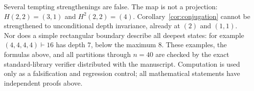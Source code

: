 \documentclass[10pt]{amsart}
\theoremstyle{definition}
\begin{document}
Several tempting strengthenings are false.  The map is not a projection:
$H(2,2)=(3,1)$ and $H^2(2,2)=(4)$.  Corollary~\ref{cor:conjugation} cannot
be strengthened to unconditional depth invariance, already at
$(2)$ and $(1,1)$.  Nor does a simple rectangular boundary describe all
deepest states: for example $(4,4,4,4)\vdash16$ has depth $7$, below the
maximum $8$.  These examples, the formulas above, and all partitions through
$n=40$ are checked by the exact standard-library verifier distributed with
the manuscript.  Computation is used only as a falsification and regression
control; all mathematical statements have independent proofs above.



\end{document}
